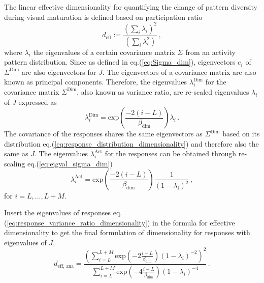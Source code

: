 \documentclass[11pt]{article}
\begin{document}
{	The linear effective dimensionality
	for quantifying the change of pattern diversity during visual maturation is defined based on participation ratio 
		\begin{equation} \label{eq:effective_dimensionality_analytical}
			d_{\text{eff}} := \frac{\left(\sum_{i} \lambda_i\right)^2}{\left( \sum_{i} \lambda_i^2\right)} \, ,
		\end{equation}
	where $\lambda_i$ the eigenvalues of a certain covariance matrix $\Sigma$ from an activity pattern distribution. Since as defined in eq.(\ref{eq:Sigma_dim}), eigenvectors $e_i$ of $\Sigma^{\text{Dim}}$ are also eigenvectors for $J$. The eigenvectors of a covariance matrix are also known as principal components. Therefore, the eigenvalues $\lambda_i^{\text{Dim}}$ for the covariance matrix $\Sigma^{\text{Dim}}$, also known as variance ratio, are re-scaled eigenvalues $\lambda_i$ of $J$ expressed as
		\begin{equation} \label{eq:eigval_sigma_dim}
			\lambda_i^{\text{Dim}} = \text{exp}\left(\frac{-2(i-L)}{\beta_{\text{dim}}}\right) \lambda_i \, .
		\end{equation}
	The covariance of the responses shares the same eigenvectors as $\Sigma^{\text{Dim}}$ based on its distribution eq.(\ref{eq:response_distribution_dimensionality}) and therefore also the same as $J$. The eigenvalues $\lambda_i^{\text{Act}}$ for the responses can be obtained through re-scaling eq.(\ref{eq:eigval_sigma_dim}) 
		\begin{equation} \label{eq:response_variance_ratio_dimensionality}
			\lambda_i^{\text{Act}} = \text{exp}\left(\frac{-2(i-L)}{\beta_{\text{dim}}}\right) \frac{1}{(1-\lambda_i)^2} \, ,
		\end{equation}
	for $i = L, ..., L+M$. %
	
	Insert the eigenvalues of responses eq.(\ref{eq:response_variance_ratio_dimensionality}) in the formula for effective dimensionality to get the final formulation of dimensionality for responses with eigenvalues of $J$, 
		\begin{equation} \label{eq:dim_analytical_sym}
			d_{\text{eff, ana}} = \frac{\left(\sum_{i = L}^{L + M} \text{exp}\left(-2 \frac{i-L}{\beta_{\text{dim}}}\right)(1-\lambda_i)^{-2}\right)^2}{\sum_{i=L}^{L+M} \text{exp}\left(-4 \frac{i-L}{\beta_{\text{dim}}}\right)(1-\lambda_i)^{-4}} \, .
		\end{equation}
	
}
\end{document}
